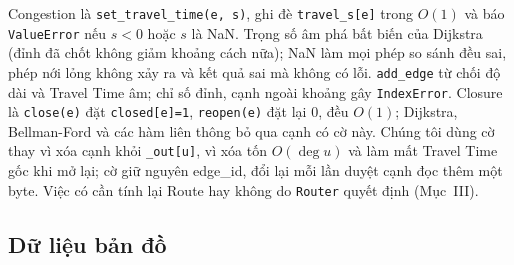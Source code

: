 Congestion là \texttt{set\_travel\_time(e, s)}, ghi đè \texttt{travel\_s[e]} trong $O(1)$ và báo \texttt{ValueError} nếu $s<0$ hoặc $s$ là NaN. Trọng số âm phá bất biến của Dijkstra (đỉnh đã chốt không giảm khoảng cách nữa); NaN làm mọi phép so sánh đều sai, phép nới lỏng không xảy ra và kết quả sai mà không có lỗi. \texttt{add\_edge} từ chối độ dài và Travel Time âm; chỉ số đỉnh, cạnh ngoài khoảng gây \texttt{IndexError}. Closure là \texttt{close(e)} đặt \texttt{closed[e]=1}, \texttt{reopen(e)} đặt lại 0, đều $O(1)$; Dijkstra, Bellman-Ford và các hàm liên thông bỏ qua cạnh có cờ này. Chúng tôi dùng cờ thay vì xóa cạnh khỏi \texttt{\_out[u]}, vì xóa tốn $O(\deg u)$ và làm mất Travel Time gốc khi mở lại; cờ giữ nguyên edge\_id, đổi lại mỗi lần duyệt cạnh đọc thêm một byte. Việc có cần tính lại Route hay không do \texttt{Router} quyết định (Mục~III).

\subsection{Dữ liệu bản đồ}

